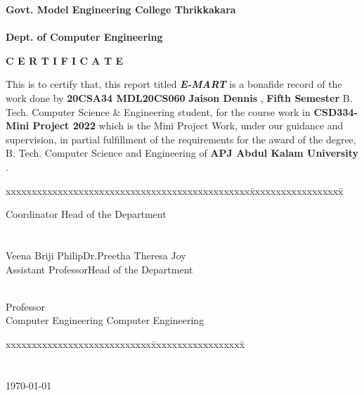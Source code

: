 \documentclass[11pt]{report}
\begin{document}
\begin{titlepage}
\begin{center}
\Large{\textbf{Govt. Model Engineering College Thrikkakara}}\\
\Large{\textbf{\\Dept. of Computer Engineering}}\\
\end{center}
\begin{figure}[h]
\begin{center}
\end{center}
\end{figure}
\begin{center}
\Large{\textbf{C E R T I F I C A T E}}\\
\vspace{.1in}
\end{center}
This is to certify that, this report titled \textbf{\textit {E-MART}} is a bonafide record of the work done by
{\textbf{20CSA34
MDL20CS060
}{\textbf{Jaison Dennis}}} {{, \textbf{Fifth Semester} B. Tech. Computer Science \& Engineering }}
student,  for the course work in \textbf{CSD334-Mini Project 2022} which is the Mini Project Work, under our guidance and supervision, in partial 
 fulfillment of the requirements for the award of the degree, B. Tech. Computer 
Science  and Engineering of \textbf{APJ Abdul Kalam University }.
\vspace{.1in}
\begin{tabbing}
xxxxxxxxxxxxxxxxxxxxxxxxxxxxxxxxxxxxxxxxxxxxxxx\= xxxxxxxxxxxxxxxxxx\= \kill

						Coordinator	\>Head of the Department
\\
\\
\\
  Veena Briji Philip\>Dr.Preetha Theresa Joy\\
	Assistant Professor\>Head of the Department
	
	 \\
	 \>Professor\\
Computer Engineering	\>	Computer Engineering
\end{tabbing}
\vspace{.08in}
%
\begin{tabbing}
xxxxxxxxxxxxxxxxxxxxxxxxxxxx\= xxxxxxxxxxxxxxxxxx\= \kill
			 \\
\\
\\
\today
\end{tabbing}
\end{titlepage}
\end{document}

